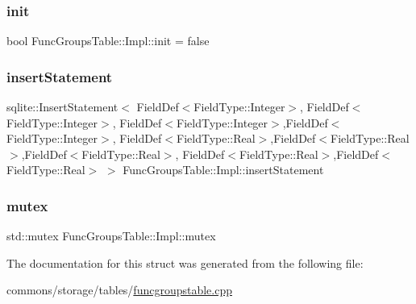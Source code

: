 \mbox{\label{struct_func_groups_table_1_1_impl_a5e07c7511997a9a380824a78bd64bf8a}} 
\subsubsection{\texorpdfstring{init}{init}}
{\footnotesize\ttfamily bool Func\+Groups\+Table\+::\+Impl\+::init = false}

\mbox{\label{struct_func_groups_table_1_1_impl_a81e61b0d9f088e4ebf70648a96c99504}} 
\subsubsection{\texorpdfstring{insertStatement}{insertStatement}}
{\footnotesize\ttfamily sqlite\+::\+Insert\+Statement$<$ Field\+Def$<$Field\+Type\+::\+Integer$>$, Field\+Def$<$Field\+Type\+::\+Integer$>$, Field\+Def$<$Field\+Type\+::\+Integer$>$,Field\+Def$<$Field\+Type\+::\+Integer$>$, Field\+Def$<$Field\+Type\+::\+Real$>$,Field\+Def$<$Field\+Type\+::\+Real$>$,Field\+Def$<$Field\+Type\+::\+Real$>$, Field\+Def$<$Field\+Type\+::\+Real$>$,Field\+Def$<$Field\+Type\+::\+Real$>$ $>$ Func\+Groups\+Table\+::\+Impl\+::insert\+Statement}

\mbox{\label{struct_func_groups_table_1_1_impl_aa67d42c38cac704731ee0e0558fc4bd3}} 
\subsubsection{\texorpdfstring{mutex}{mutex}}
{\footnotesize\ttfamily std\+::mutex Func\+Groups\+Table\+::\+Impl\+::mutex}



The documentation for this struct was generated from the following file\+:\begin{DoxyCompactItemize}
\item 
commons/storage/tables/\mbox{\hyperlink{funcgroupstable_8cpp}{funcgroupstable.\+cpp}}\end{DoxyCompactItemize}
